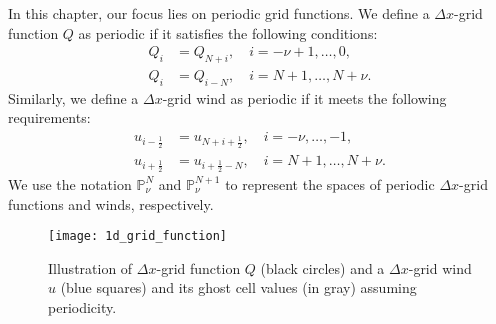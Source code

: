 In this chapter, our focus lies on periodic grid functions.
We define a $\Delta x$-grid function $Q$ as periodic if it satisfies the following conditions:
\begin{align*}
    Q_{i} &= Q_{N+i}, \quad i=-\nu+1, \ldots, 0,\\
    Q_{i} &= Q_{i-N}, \quad i=N+1, \ldots, N+\nu.
\end{align*}
Similarly, we define a $\Delta x$-grid wind as periodic if it meets the following requirements:
\begin{align*}
    u_{i-\frac{1}{2}} &= u_{N+i+\frac{1}{2}} , \quad i=-\nu, \ldots, -1,\\
    u_{i+\frac{1}{2}} &= u_{i+\frac{1}{2}-N} , \quad i=N+1, \ldots, N+\nu.
\end{align*}
We use the notation $\mathbb{P}^{N}_{\nu}$ and $\mathbb{P}^{N+1}_{\nu}$ to
represent the spaces of periodic $\Delta x$-grid functions and winds, respectively.
\begin{figure}[!htb] 
\centering 
\texttt{[image: 1d\_grid\_function]} 
\caption{Illustration of $\Delta x$-grid function $Q$ (black circles)
and a $\Delta x$-grid wind $u$ (blue squares) and its ghost cell
values (in gray) assuming periodicity.\label{chp2-sec1-grid1d-function}}
\end{figure}

